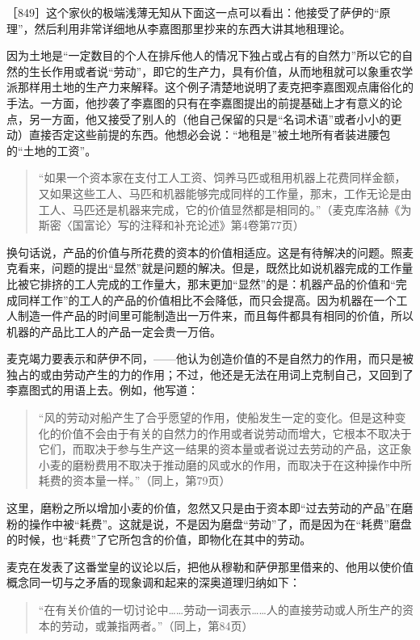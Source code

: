 ［849］这个家伙的极端浅薄无知从下面这一点可以看出：他接受了萨伊的“原理”，然后利用非常详细地从李嘉图那里抄来的东西大讲其地租理论。

因为土地是“一定数目的个人在排斥他人的情况下独占或占有的自然力”所以它的自然的生长作用或者说“劳动”，即它的生产力，具有价值，从而地租就可以象重农学派那样用土地的生产力来解释。这个例子清楚地说明了麦克把李嘉图观点庸俗化的手法。一方面，他抄袭了李嘉图的只有在李嘉图提出的前提基础上才有意义的论点，另一方面，他又接受了别人的（他自己保留的只是“名词术语”或者小小的更动）直接否定这些前提的东西。他想必会说：“地租是”被土地所有者装进腰包的“土地的工资”。

\begin{quote}{“如果一个资本家在支付工人工资、饲养马匹或租用机器上花费同样金额，又如果这些工人、马匹和机器能够完成同样的工作量，那末，工作无论是由工人、马匹还是机器来完成，它的价值显然都是相同的。”（麦克库洛赫《为斯密〈国富论〉写的注释和补充论述》第4卷第77页）}\end{quote}

换句话说，产品的价值与所花费的资本的价值相适应。这是有待解决的问题。照麦克看来，问题的提出“显然”就是问题的解决。但是，既然比如说机器完成的工作量比被它排挤的工人完成的工作量大，那末更加“显然”的是：机器产品的价值和“完成同样工作”的工人的产品的价值相比不会降低，而只会提高。因为机器在一个工人制造一件产品的时间里可能制造出一万件来，而且每件都具有相同的价值，所以机器的产品比工人的产品一定会贵一万倍。

麦克竭力要表示和萨伊不同，——他认为创造价值的不是自然力的作用，而只是被独占的或由劳动产生的力的作用；不过，他还是无法在用词上克制自己，又回到了李嘉图式的用语上去。例如，他写道：

\begin{quote}{“风的劳动对船产生了合乎愿望的作用，使船发生一定的变化。但是这种变化的价值不会由于有关的自然力的作用或者说劳动而增大，它根本不取决于它们，而取决于参与生产这一结果的资本量或者说过去劳动的产品，这正象小麦的磨粉费用不取决于推动磨的风或水的作用，而取决于在这种操作中所耗费的资本量一样。”（同上，第79页）}\end{quote}

这里，磨粉之所以增加小麦的价值，忽然又只是由于资本即“过去劳动的产品”在磨粉的操作中被“耗费”。这就是说，不是因为磨盘“劳动”了，而是因为在“耗费”磨盘的时候，也“耗费”了它所包含的价值，即物化在其中的劳动。

麦克在发表了这番堂皇的议论以后，把他从穆勒和萨伊那里借来的、他用以使价值概念同一切与之矛盾的现象调和起来的深奥道理归纳如下：

\begin{quote}{“在有关价值的一切讨论中……劳动一词表示……人的直接劳动或人所生产的资本的劳动，或兼指两者。”（同上，第84页）}\end{quote}

